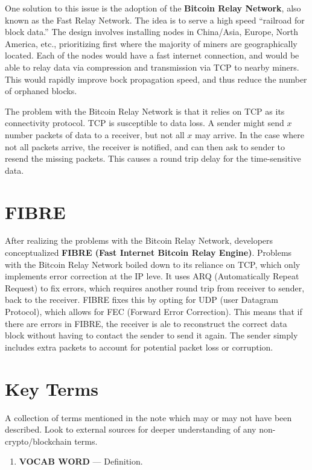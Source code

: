 \documentclass[full.tex]{subfiles}
\begin{document}
 One solution to this issue is the adoption of the \textbf{Bitcoin Relay Network}, also known as the Fast Relay Network. The idea is to serve a high speed ``railroad for block data.'' The design involves installing nodes in China/Asia, Europe, North America, etc., prioritizing first where the majority of miners are geographically located. Each of the nodes would have a fast internet connection, and would be able to relay data via compression and transmission via TCP to nearby miners. This would rapidly improve bock propagation speed, and thus reduce the number of orphaned blocks.
 
 The problem with the Bitcoin Relay Network is that it relies on TCP as its connectivity protocol. TCP is susceptible to data loss. A sender might send $x$ number packets of data to a receiver, but not all $x$ may arrive. In the case where not all packets arrive, the receiver is notified, and can then ask to sender to resend the missing packets. This causes a round trip delay for the time-sensitive data.
 
 \section*{FIBRE}
 
 After realizing the problems with the Bitcoin Relay Network, developers conceptualized \textbf{FIBRE (Fast Internet Bitcoin Relay Engine)}. Problems with the Bitcoin Relay Network boiled down to its reliance on TCP, which only implements error correction at the IP leve. It uses ARQ (Automatically Repeat Request) to fix errors, which requires another round trip from receiver to sender, back to the receiver. FIBRE fixes this by opting for UDP (user Datagram Protocol), which allows for FEC (Forward Error Correction). This means that if there are errors in FIBRE, the receiver is ale to reconstruct the correct data block without having to contact the sender to send it again. The sender simply includes extra packets to account for potential packet loss or corruption.

 
 
    
    
    
    
    \newpage
    \thispagestyle{firstpage}
    \vspace*{2\baselineskip}
    \section*{Key Terms}
    \noindent A collection of terms mentioned in the note which may or may not have been described. Look to external sources for deeper understanding of any non-crypto/blockchain terms.
    \begin{enumerate}
        \item \textbf{VOCAB WORD} --- Definition. %
    \end{enumerate}
\end{document}
